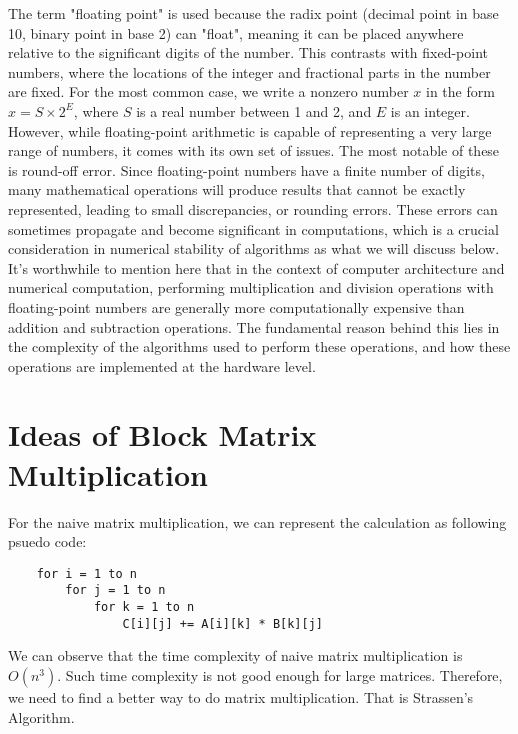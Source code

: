 \documentclass{article}
\begin{document}
The term "floating point" is used because the radix point (decimal point in base 10, binary point in base 2) can "float", meaning it can be placed 
anywhere relative to the significant digits of the number. This contrasts with fixed-point numbers, where the locations of the integer and 
fractional parts in the number are fixed. For the most common case, we write a nonzero number $x$ in the form $x = S \times 2^E$, where $S$ is a 
real number between 1 and 2, and $E$ is an integer.\\

However, while floating-point arithmetic is capable of representing a very large range of numbers, it comes with its own set of issues. The most 
notable of these is round-off error. Since floating-point numbers have a finite number of digits, many mathematical operations will produce results 
that cannot be exactly represented, leading to small discrepancies, or rounding errors. These errors can sometimes propagate and become significant 
in computations, which is a crucial consideration in numerical stability of algorithms as what we will discuss below.\\

It's worthwhile to mention here that in the context of computer architecture and numerical computation, performing multiplication and division 
operations with floating-point numbers are generally more computationally expensive than addition and subtraction operations. The fundamental 
reason behind this lies in the complexity of the algorithms used to perform these operations, and how these operations are implemented at the 
hardware level.


\section{Ideas of Block Matrix Multiplication}
\hspace{5.5mm}For the naive matrix multiplication, we can represent the calculation as following psuedo code:
\begin{verbatim}
    for i = 1 to n
        for j = 1 to n
            for k = 1 to n
                C[i][j] += A[i][k] * B[k][j]
\end{verbatim}

We can observe that the time complexity of naive matrix multiplication is $O(n^3)$. Such time complexity is not good enough for
large matrices. Therefore, we need to find a better way to do matrix multiplication. That is Strassen's Algorithm.\\
\end{document}
